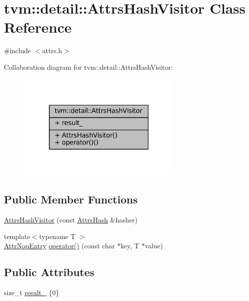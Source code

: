 \hypertarget{classtvm_1_1detail_1_1AttrsHashVisitor}{}\section{tvm\+:\+:detail\+:\+:Attrs\+Hash\+Visitor Class Reference}
\label{classtvm_1_1detail_1_1AttrsHashVisitor}


{\ttfamily \#include $<$attrs.\+h$>$}



Collaboration diagram for tvm\+:\+:detail\+:\+:Attrs\+Hash\+Visitor\+:
\nopagebreak
\begin{figure}[H]
\begin{center}
\leavevmode
\includegraphics[width=232pt]{classtvm_1_1detail_1_1AttrsHashVisitor__coll__graph}
\end{center}
\end{figure}
\subsection*{Public Member Functions}
\begin{DoxyCompactItemize}
\item 
\hyperlink{classtvm_1_1detail_1_1AttrsHashVisitor_aef1bb3e8aebea0a00e41771ce7b4a069}{Attrs\+Hash\+Visitor} (const \hyperlink{classtvm_1_1AttrsHash}{Attrs\+Hash} \&hasher)
\item 
{\footnotesize template$<$typename T $>$ }\\\hyperlink{structtvm_1_1detail_1_1AttrNopEntry}{Attr\+Nop\+Entry} \hyperlink{classtvm_1_1detail_1_1AttrsHashVisitor_acef34f01ee1d62e46bade808cf76ab2e}{operator()} (const char $\ast$key, T $\ast$value)
\end{DoxyCompactItemize}
\subsection*{Public Attributes}
\begin{DoxyCompactItemize}
\item 
size\+\_\+t \hyperlink{classtvm_1_1detail_1_1AttrsHashVisitor_ae9491954f6d62082106ec1a89297a344}{result\+\_\+} \{0\}
\end{DoxyCompactItemize}


